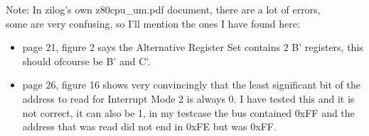 \documentclass[oneside,a4paper]{book}
\begin{document}
Note: In zilog's own z80cpu\_um.pdf document, there are a lot of errors,\\
some are very confusing, so I'll mention the ones I have found here:

\begin{itemize}

\item
  page 21, figure 2 says the Alternative Register Set contains 2 B' registers, 
  this should ofcourse be B' and C'.  

\item
  page 26, figure 16 shows very convincingly that the least significant bit of 
  the address to read for Interrupt Mode 2 is always 0. I have tested this and 
  it is not correct, it can also be 1, in my testcase the bus contained 0xFF and
  the address that was read did not end in 0xFE but was 0xFF.
  
\end{itemize}
\end{document}
